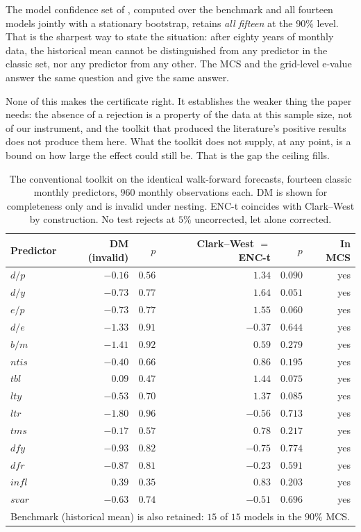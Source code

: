 \documentclass{article}
\theoremstyle{plain}
\theoremstyle{definition}
\begin{document}
The model confidence set of \citet{hansen2011}, computed over the benchmark and all fourteen
models jointly with a stationary bootstrap, retains \emph{all fifteen} at the $90\%$ level. That
is the sharpest way to state the situation: after eighty years of monthly data, the historical
mean cannot be distinguished from any predictor in the classic set, nor any predictor from any
other. The MCS and the grid-level e-value answer the same question and give the same answer.

None of this makes the certificate right. It establishes the weaker thing the paper needs: the
absence of a rejection is a property of the data at this sample size, not of our instrument, and
the toolkit that produced the literature's positive results does not produce them here. What the
toolkit does not supply, at any point, is a bound on how large the effect could still be. That
is the gap the ceiling fills.

\begin{table}[t]
  \centering
  \caption{The conventional toolkit on the identical walk-forward forecasts, fourteen classic
  monthly predictors, $960$ monthly observations each. DM is shown for completeness only and is
  invalid under nesting. ENC-t coincides with Clark--West by construction. No test rejects at
  $5\%$ uncorrected, let alone corrected.}
  \label{tab:toolkit}
  \small
  \begin{tabular}{lrrrrr}
    \toprule
    Predictor & DM (invalid) & $p$ & Clark--West $=$ ENC-t & $p$ & In MCS \\
    \midrule
    $d/p$  & $-0.16$ & $0.56$ & $1.34$  & $0.090$ & yes \\
    $d/y$  & $-0.73$ & $0.77$ & $1.64$  & $0.051$ & yes \\
    $e/p$  & $-0.73$ & $0.77$ & $1.55$  & $0.060$ & yes \\
    $d/e$  & $-1.33$ & $0.91$ & $-0.37$ & $0.644$ & yes \\
    $b/m$  & $-1.41$ & $0.92$ & $0.59$  & $0.279$ & yes \\
    $ntis$ & $-0.40$ & $0.66$ & $0.86$  & $0.195$ & yes \\
    $tbl$  & $0.09$  & $0.47$ & $1.44$  & $0.075$ & yes \\
    $lty$  & $-0.53$ & $0.70$ & $1.37$  & $0.085$ & yes \\
    $ltr$  & $-1.80$ & $0.96$ & $-0.56$ & $0.713$ & yes \\
    $tms$  & $-0.17$ & $0.57$ & $0.78$  & $0.217$ & yes \\
    $dfy$  & $-0.93$ & $0.82$ & $-0.75$ & $0.774$ & yes \\
    $dfr$  & $-0.87$ & $0.81$ & $-0.23$ & $0.591$ & yes \\
    $infl$ & $0.39$  & $0.35$ & $0.83$  & $0.203$ & yes \\
    $svar$ & $-0.63$ & $0.74$ & $-0.51$ & $0.696$ & yes \\
    \midrule
    \multicolumn{6}{l}{Benchmark (historical mean) is also retained: $15$ of $15$ models in the
    $90\%$ MCS.} \\
    \bottomrule
  \end{tabular}
\end{table}
\end{document}
